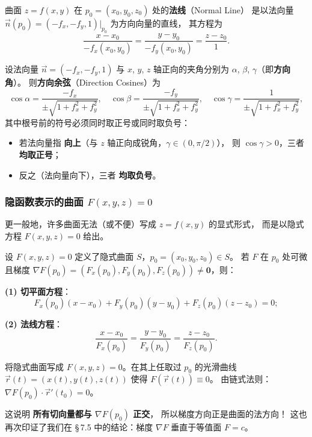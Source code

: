 \documentclass[lang=cn,11pt]{elegantbook}
\begin{document}
\begin{property}[显式曲面的法线方程] \label{property:normal-line-explicit}
曲面 $z=f(x,y)$ 在 $p_0=(x_0,y_0,z_0)$ 处的\textbf{法线}（Normal Line）
是以法向量 $\vec{n}(p_0)=(-f_x,-f_y,1)\big|_{p_0}$ 为方向向量的直线，
其方程为
\[
\boxed{
\frac{x-x_0}{-f_x(x_0,y_0)}
=\frac{y-y_0}{-f_y(x_0,y_0)}
=\frac{z-z_0}{1}}.
\]
\end{property}

\begin{property}[方向余弦公式] \label{property:direction-cosines}
设法向量 $\vec{n}=(-f_x,-f_y,1)$ 与 $x$, $y$, $z$ 轴正向的夹角分别为
$\alpha$, $\beta$, $\gamma$（即\textbf{方向角}）。
则\textbf{方向余弦}（Direction Cosines）为
\[
\boxed{
\cos\alpha=\frac{-f_x}{\pm\sqrt{1+f_x^2+f_y^2}},\quad
\cos\beta=\frac{-f_y}{\pm\sqrt{1+f_x^2+f_y^2}},\quad
\cos\gamma=\frac{1}{\pm\sqrt{1+f_x^2+f_y^2}}},
\]
其中根号前的符号必须同时取正号或同时取负号：
\begin{itemize}
  \item 若法向量指 \textbf{向上}（与 $z$ 轴正向成锐角，$\gamma\in(0,\pi/2)$），
        则 $\cos\gamma>0$，三者 \textbf{均取正号}；
  \item 反之（法向量向下），三者 \textbf{均取负号}。
\end{itemize}
\end{property}

\subsubsection*{隐函数表示的曲面 $F(x,y,z)=0$}

更一般地，许多曲面无法（或不便）写成 $z=f(x,y)$ 的显式形式，
而是以隐式方程 $F(x,y,z)=0$ 给出。

\begin{proposition}[隐式曲面的切平面与法线] \label{prop:implicit-surface}
设 $F(x,y,z)=0$ 定义了隐式曲面 $S$，$p_0=(x_0,y_0,z_0)\in S$。
若 $F$ 在 $p_0$ 处可微且梯度 $\nabla F(p_0)=(F_x(p_0),F_y(p_0),F_z(p_0)) \neq \boldsymbol{0}$，则：

\textbf{(1) 切平面方程}：
\[
\boxed{
F_x(p_0)(x-x_0)+F_y(p_0)(y-y_0)+F_z(p_0)(z-z_0)=0};
\]

\textbf{(2) 法线方程}：
\[
\boxed{
\frac{x-x_0}{F_x(p_0)}
=\frac{y-y_0}{F_y(p_0)}
=\frac{z-z_0}{F_z(p_0)}}.
\]
\end{proposition}

\begin{note}[为什么法向量恰好是梯度？]
将隐式曲面写成 $F(x,y,z)=0$。在其上任取过 $p_0$ 的光滑曲线
$\vec{r}(t)=(x(t),y(t),z(t))$ 使得 $F(\vec{r}(t))\equiv 0$。
由链式法则：
$\nabla F(p_0)\cdot\vec{r}'(t_0)=0$。

这说明 \textbf{所有切向量都与 $\nabla F(p_0)$ 正交}，
所以梯度方向正是曲面的法方向！
这也再次印证了我们在 \S\,7.5 中的结论：梯度 $\nabla F$ 垂直于等值面 $F=c$。
\end{note}
\end{document}
